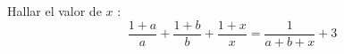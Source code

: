 \documentclass[12pt]{article}
\begin{document}
Hallar el valor de $x$ :
$$\frac{1 + a}{a} + \frac{1 + b}{b} + \frac{1 + x}{x} = \frac{1}{a + b + x} + 3$$
\end{document}
